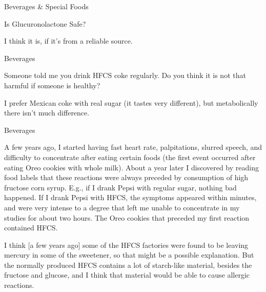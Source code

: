 \documentclass[11pt,oneside,openany,extrafontsizes]{memoir}
\begin{document}
\begin{qaexchange}{Beverages \& Special Foods}

    \begin{question}
        Is Glucuronolactone Safe?
    \end{question}

    \begin{answer}
        I think it is, if it's from a reliable source.
    \end{answer}
\end{qaexchange}

\begin{qaexchange}{Beverages}

    \begin{question}
        Someone told me you drink HFCS coke regularly. Do you think it is not that harmful if someone is healthy?
    \end{question}

    \begin{answer}
        I prefer Mexican coke with real sugar (it tastes very different), but metabolically there isn't much difference.
    \end{answer}
\end{qaexchange}

\begin{emailexchange}{Beverages}

    \begin{question}
        A few years ago, I started having fast heart rate, palpitations, slurred speech, and difficulty to concentrate after eating certain foods (the first event occurred after eating Oreo cookies with whole milk). About a year later I discovered by reading food labels that these reactions were always preceded by consumption of high fructose corn syrup. E.g., if I drank Pepsi with regular sugar, nothing bad happened. If I drank Pepsi with HFCS, the symptoms appeared within minutes, and were very intense to a degree that left me unable to concentrate in my studies for about two hours. The Oreo cookies that preceded my first reaction contained HFCS.
    \end{question}

    \begin{answer}
        I think [a few years ago] some of the HFCS factories were found to be leaving mercury in some of the sweetener, so that might be a possible explanation. But the normally produced HFCS contains a lot of starch-like material, besides the fructose and glucose, and I think that material would be able to cause allergic reactions.
    \end{answer}
\end{emailexchange}
\end{document}
